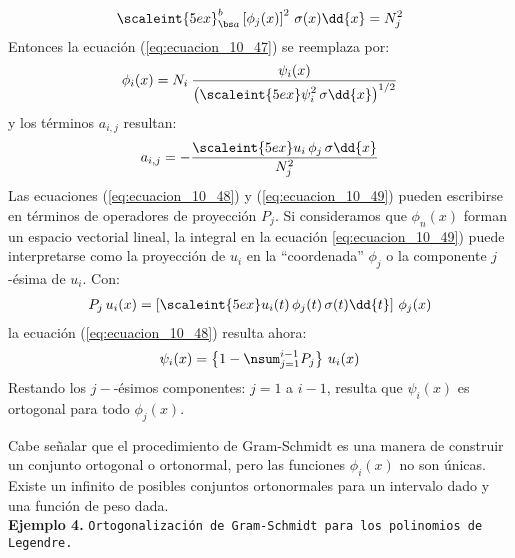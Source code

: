 \begin{align*}
\scaleint{5ex}_{\bs a}^{b} \left[ \phi_{j} (x) \right]^{2} \, \sigma (x) \dd{x} =  N_{j}^{2}
\end{align*}
Entonces la ecuación (\ref{eq:ecuacion_10_47}) se reemplaza por:
\begin{align}
\phi_{i}(x) =  N_{i} \: \dfrac{\psi_{i}(x)}{\left( \displaystyle \scaleint{5ex} \psi_{i}^{2} \, \sigma \dd{x} \right)^{1/2}}
\label{eq:ecuacion_10_47a}
\end{align}
y los términos $a_{i,j}$ resultan:
\begin{align}
a_{i, j} = - \dfrac{ \displaystyle \scaleint{5ex} u_{i} \, \phi_{j} \, \sigma \dd{x}}{N_{j}^{2}}
\label{eq:ecuacion_10_49a}
\end{align}
Las ecuaciones (\ref{eq:ecuacion_10_48}) y (\ref{eq:ecuacion_10_49}) pueden escribirse en términos de operadores de proyección $P_{j}$. Si consideramos que $\phi_{n}(x)$ forman un espacio vectorial lineal, la integral en la ecuación \ref{eq:ecuacion_10_49}) puede interpretarse como la proyección de $u_{i}$ en la \enquote{coordenada} $\phi_{j}$ o la componente $j$-ésima de $u_{i}$. Con:
\begin{align*}
P_{j} \, u_{i}(x) = \left[ \scaleint{5ex} u_{i}(t) \, \phi_{j}(t) \, \sigma(t) \dd{t} \right]\, \phi_{j}(x)
\end{align*}
la ecuación (\ref{eq:ecuacion_10_48}) resulta ahora:
\begin{align}
\psi_{i}(x) = \left\{ 1 - \nsum_{j=1}^{i-1} P_{j} \right\} \, u_{i}(x)
\label{eq:ecuacion_10_48a}
\end{align}
Restando los $j-$-ésimos componentes: $j = 1$ a $i - 1$, resulta que $\psi_{i}(x)$ es ortogonal para todo $\phi_{j}(x)$.
\par
 Cabe señalar que el procedimiento de Gram-Schmidt es una manera de construir un conjunto ortogonal o ortonormal, pero las funciones $\phi_{i}(x)$ no son únicas. Existe un infinito de posibles conjuntos ortonormales para un intervalo dado y una función de peso dada.
\\[0.5em]
\noindent
\textbf{Ejemplo 4. } \texttt{Ortogonalización de Gram-Schmidt para los polinomios de Legendre.}

